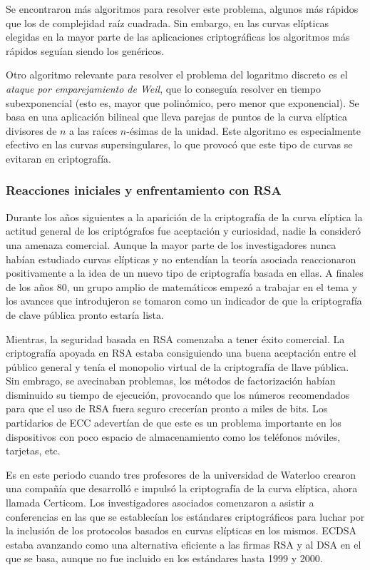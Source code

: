 \documentclass[
  a4paper,
  12pt,
  spanish,
]{scrartcl}
\begin{document}
Se encontraron más algoritmos para resolver este problema, algunos más rápidos que los de complejidad raíz cuadrada. Sin embargo, en las curvas elípticas elegidas en la mayor parte de las aplicaciones criptográficas los algoritmos más rápidos seguían siendo los genéricos.

Otro algoritmo relevante para resolver el problema del logaritmo discreto es el \textit{ataque por emparejamiento de Weil}, que lo conseguía resolver en tiempo subexponencial (esto es, mayor que polinómico, pero menor que exponencial). Se basa en una aplicación bilineal que lleva parejas de puntos de la curva elíptica divisores de $n$ a las raíces $n$-ésimas de la unidad. Este algoritmo es especialmente efectivo en las curvas supersingulares, lo que provocó que este tipo de curvas se evitaran en criptografía.

\subsubsection{Reacciones iniciales y enfrentamiento con RSA}
Durante los años siguientes a la aparición de la criptografía de la curva elíptica la actitud general de los criptógrafos fue aceptación y curiosidad, nadie la consideró una amenaza comercial. Aunque la mayor parte de los investigadores nunca habían estudiado curvas elípticas y no entendían la teoría asociada reaccionaron positivamente a la idea de un nuevo tipo de criptografía basada en ellas. A finales de los años 80, un grupo amplio de matemáticos empezó a trabajar en el tema y los avances que introdujeron se tomaron como un indicador de que la criptografía de clave pública pronto estaría lista.


Mientras, la seguridad basada en RSA comenzaba a tener éxito comercial. La criptografía apoyada en RSA estaba consiguiendo una buena aceptación entre el público general y tenía el monopolio virtual de la criptografía de llave pública. Sin embrago, se avecinaban problemas, los métodos de factorización habían disminuido su tiempo de ejecución, provocando que los números recomendados para que el uso de RSA fuera seguro crecerían pronto a miles de bits. Los partidarios de ECC adevertían de que este es un problema importante en los dispositivos con poco espacio de almacenamiento como los teléfonos móviles, tarjetas, etc.

Es en este periodo cuando tres profesores de la universidad de Waterloo crearon una compañía que desarrolló e impulsó la criptografía de la curva elíptica, ahora llamada Certicom. Los investigadores asociados comenzaron a asistir a conferencias en las que se establecían los estándares criptográficos para luchar por la inclusión de los protocolos basados en curvas elípticas en los mismos. ECDSA estaba avanzando como una alternativa eficiente a las firmas RSA y al DSA en el que se basa, aunque no fue incluido en los estándares hasta 1999 y 2000.
\end{document}
